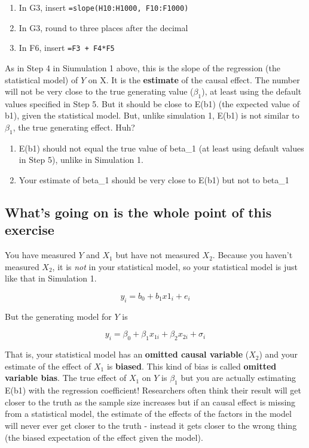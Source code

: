 \documentclass[]{book}
\providecommand{\tightlist}{%
  \setlength{\itemsep}{0pt}\setlength{\parskip}{0pt}}
\begin{document}
\begin{enumerate}
\def\labelenumi{\arabic{enumi}.}
\tightlist
\item
  In G3, insert \texttt{=slope(H10:H1000,\ F10:F1000)}
\item
  In G3, round to three places after the decimal
\item
  In F6, insert \texttt{=F3\ +\ F4*F5}
\end{enumerate}

As in Step 4 in Siumulation 1 above, this is the slope of the regression
(the statistical model) of \(Y\) on X. It is the \textbf{estimate} of
the causal effect. The number will not be very close to the true
generating value (\(\beta_1\)), at least using the default values
specified in Step 5. But it should be close to E(b1) (the expected value
of b1), given the statistical model. But, unlike simulation 1, E(b1) is
not similar to \(\beta_1\), the true generating effect. Huh?

\begin{enumerate}
\def\labelenumi{\arabic{enumi}.}
\tightlist
\item
  E(b1) should not equal the true value of beta\_1 (at least using
  default values in Step 5), unlike in Simulation 1.
\item
  Your estimate of beta\_1 should be very close to E(b1) but not to
  beta\_1
\end{enumerate}

\subsection{What's going on is the whole point of this
exercise}\label{whats-going-on-is-the-whole-point-of-this-exercise}

You have measured \(Y\) and \(X_1\) but have not measured \(X_2\).
Because you haven't measured \(X_2\), it is \emph{not} in your
statistical model, so your statistical model is just like that in
Simulation 1.

\begin{equation}
y_i = b_0 + b_1 x1_i + e_i
\end{equation}

But the generating model for \(Y\) is

\begin{equation}
y_i = \beta_0 + \beta_1 x_{1i} + \beta_2 x_{2i} + \sigma_i
\end{equation}

That is, your statistical model has an \textbf{omitted causal variable}
(\(X_2\)) and your estimate of the effect of \(X_1\) is \textbf{biased}.
This kind of bias is called \textbf{omitted variable bias}. The true
effect of \(X_1\) on \(Y\) is \(\beta_1\) but you are actually
estimating E(b1) with the regression coefficient! Researchers often
think their result will get closer to the truth as the sample size
increases but if an causal effect is missing from a statistical model,
the estimate of the effects of the factors in the model will never ever
get closer to the truth - instead it gets closer to the wrong thing (the
biased expectation of the effect given the model).
\end{document}
